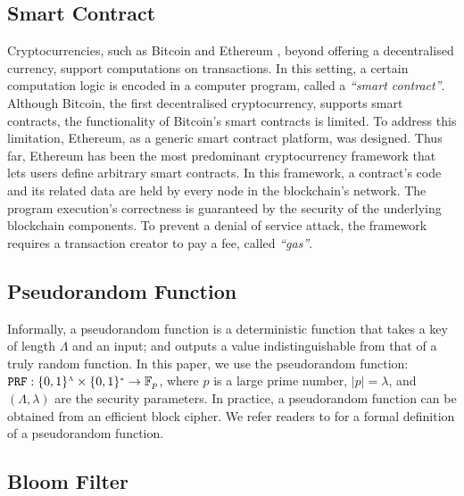 \subsection{Smart Contract}\label{subsec:SC} Cryptocurrencies, such as Bitcoin \cite{bitcoin} and Ethereum \cite{ethereum}, beyond offering a decentralised currency,  support  computations on  transactions. In this setting,  a certain computation logic is encoded in a computer program, called a \emph{``smart contract''}. Although Bitcoin, the first decentralised cryptocurrency, supports smart contracts, the functionality of Bitcoin's smart contracts is  limited. To address this limitation, Ethereum, as a generic smart contract platform, was designed. Thus far, Ethereum has been the most predominant cryptocurrency framework that lets users define arbitrary smart contracts. In this framework, a contract's code and its related data  are held by every node in the blockchain's network. The program execution's  correctness  is  guaranteed by the security of the underlying blockchain components. To prevent  a denial of service attack, the framework requires a transaction creator to pay a  fee, called \emph{``gas''}. %





\subsection{Pseudorandom Function}


Informally, a pseudorandom function is a deterministic function that takes a key of length $\Lambda$ and an input; and outputs a value  indistinguishable from that of  a truly random function.  In this paper, we use the pseudorandom function:   $\mathtt {PRF}: \{0,1\}^{\scriptscriptstyle \Lambda}\times \{0,1\}^{\scriptscriptstyle *} \rightarrow  \mathbb{F}_p$, where $p$ is a large prime number, $|p|=\lambda$, and $(\Lambda,\lambda)$ are the security parameters. In practice, a pseudorandom function can be obtained from an efficient block cipher. We refer readers to \cite{DBLP:books/crc/KatzLindell2014} for a formal definition of a pseudorandom function.


\subsection{Bloom Filter}


